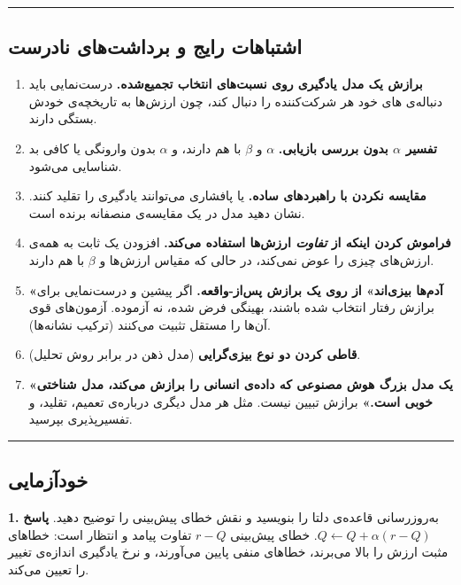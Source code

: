\begin{center}\rule{0.5\linewidth}{0.5pt}\end{center}

\subsection{اشتباهات رایج و برداشت‌های نادرست}

\begin{enumerate}
\def\labelenumi{\arabic{enumi}.}
\tightlist
\item
  \textbf{برازش یک مدل یادگیری روی نسبت‌های انتخاب تجمیع‌شده.} درست‌نمایی
  باید دنباله‌ی های خود هر شرکت‌کننده را دنبال کند، چون ارزش‌ها
  به تاریخچه‌ی خودش بستگی دارند.
\item
  \textbf{تفسیر \(\alpha\) بدون بررسی بازیابی.} \(\alpha\) و \(\beta\)
  با هم  دارند، و \(\alpha\) بدون وارونگی یا 
  کافی بد شناسایی می‌شود.
\item
  \textbf{مقایسه نکردن با راهبردهای ساده.}  یا
  پافشاری  می‌توانند یادگیری را تقلید کنند. نشان دهید
  مدل  در یک مقایسه‌ی منصفانه برنده است.
\item
  \textbf{فراموش کردن اینکه  از \emph{تفاوت} ارزش‌ها استفاده
  می‌کند.} افزودن یک ثابت به همه‌ی ارزش‌های  چیزی را عوض نمی‌کند، در
  حالی که مقیاس ارزش‌ها و \(\beta\) با هم  دارند.
\item
  \textbf{«آدم‌ها بیزی‌اند» از روی یک برازش پس‌از-واقعه.} اگر پیشین و
  درست‌نمایی برای برازش رفتار انتخاب شده باشند، بهینگی فرض شده، نه
  آزموده. آزمون‌های قوی آن‌ها را مستقل تثبیت می‌کنند (ترکیب نشانه‌ها).
\item
  \textbf{قاطی کردن دو نوع بیزی‌گرایی} (مدل ذهن در برابر روش تحلیل).
\item
  \textbf{«یک مدل بزرگ هوش مصنوعی که داده‌ی انسانی را برازش می‌کند، مدل
  شناختی خوبی است.»} برازش تبیین نیست. مثل هر مدل دیگری درباره‌ی تعمیم،
  تقلید،  و تفسیرپذیری بپرسید.
\end{enumerate}

\begin{center}\rule{0.5\linewidth}{0.5pt}\end{center}

\subsection{خودآزمایی}

\textbf{1.} به‌روزرسانی قاعده‌ی دلتا را بنویسید و نقش خطای پیش‌بینی را
توضیح دهید. \textbf{پاسخ} \(Q \leftarrow Q + \alpha(r - Q)\). خطای
پیش‌بینی \(r - Q\) تفاوت پیامد و انتظار است: خطاهای مثبت ارزش را بالا
می‌برند، خطاهای منفی پایین می‌آورند، و نرخ یادگیری اندازه‌ی تغییر را تعیین
می‌کند.

